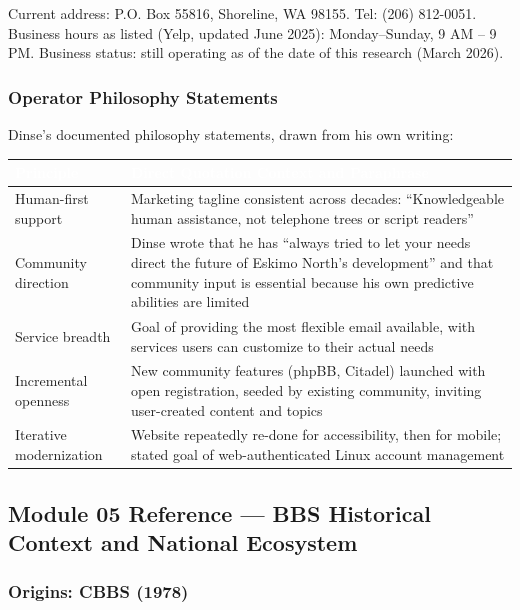 \documentclass[11pt,letterpaper]{article}
\newcommand{\tableheader}[1]{\textbf{\sffamily\textcolor{white}{#1}}}
\begin{document}
Current address: P.O. Box 55816, Shoreline, WA 98155. Tel: (206) 812-0051. Business hours as listed (Yelp, updated June 2025): Monday--Sunday, 9 AM -- 9 PM. Business status: still operating as of the date of this research (March 2026).

\subsubsection{Operator Philosophy Statements}

Dinse's documented philosophy statements, drawn from his own writing:

\begin{center}
\begin{tabularx}{\textwidth}{L{4cm}X}
\toprule
{}
\tableheader{Principle} & \tableheader{Direct Quotation Context and Paraphrase} \\
\midrule
Human-first support & Marketing tagline consistent across decades: ``Knowledgeable human assistance, not telephone trees or script readers'' \\
Community direction & Dinse wrote that he has ``always tried to let your needs direct the future of Eskimo North's development'' and that community input is essential because his own predictive abilities are limited \\
Service breadth & Goal of providing the most flexible email available, with services users can customize to their actual needs \\
Incremental openness & New community features (phpBB, Citadel) launched with open registration, seeded by existing community, inviting user-created content and topics \\
Iterative modernization & Website repeatedly re-done for accessibility, then for mobile; stated goal of web-authenticated Linux account management \\
\bottomrule
\end{tabularx}
\end{center}

\subsection{Module 05 Reference --- BBS Historical Context and National Ecosystem}

\subsubsection{Origins: CBBS (1978)}
\end{document}

